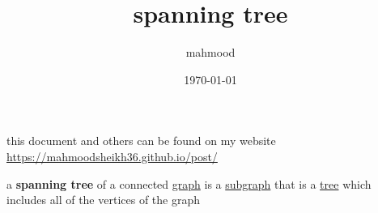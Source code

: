 \documentclass[a4paper,12pt]{article}
\author{mahmood}
\date{\today}
\title{spanning tree}
\begin{document}
\maketitle
\begin{note}
this document and others can be found on my website\\
\url{https://mahmoodsheikh36.github.io/post/}
\end{note}
\begin{definition}
a \textbf{spanning tree} of a connected \href{20230314001051-graph.org}{graph} is a \href{20230415231031-subgraph.org}{subgraph} that is a \href{20230323170647-tree.org}{tree} which includes all of the vertices of the graph\\
\end{definition}
\end{document}
